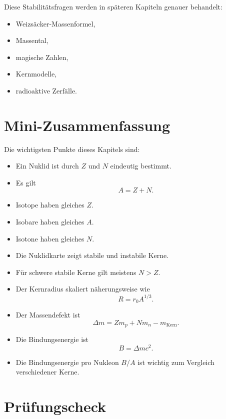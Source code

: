 \begin{notebox}
Diese Stabilitätsfragen werden in späteren Kapiteln genauer behandelt:
\begin{itemize}
    \item Weizsäcker-Massenformel,
    \item Massental,
    \item magische Zahlen,
    \item Kernmodelle,
    \item radioaktive Zerfälle.
\end{itemize}
\end{notebox}

\section{Mini-Zusammenfassung}

\begin{notebox}
Die wichtigsten Punkte dieses Kapitels sind:
\begin{itemize}
    \item Ein Nuklid ist durch $Z$ und $N$ eindeutig bestimmt.
    \item Es gilt
    \[
        A=Z+N.
    \]
    \item Isotope haben gleiches $Z$.
    \item Isobare haben gleiches $A$.
    \item Isotone haben gleiches $N$.
    \item Die Nuklidkarte zeigt stabile und instabile Kerne.
    \item Für schwere stabile Kerne gilt meistens $N>Z$.
    \item Der Kernradius skaliert näherungsweise wie
    \[
        R=r_0A^{1/3}.
    \]
    \item Der Massendefekt ist
    \[
        \Delta m = Zm_p + Nm_n - m_{\mathrm{Kern}}.
    \]
    \item Die Bindungsenergie ist
    \[
        B=\Delta mc^2.
    \]
    \item Die Bindungsenergie pro Nukleon $B/A$ ist wichtig zum Vergleich verschiedener Kerne.
\end{itemize}
\end{notebox}

\section{Prüfungscheck}

